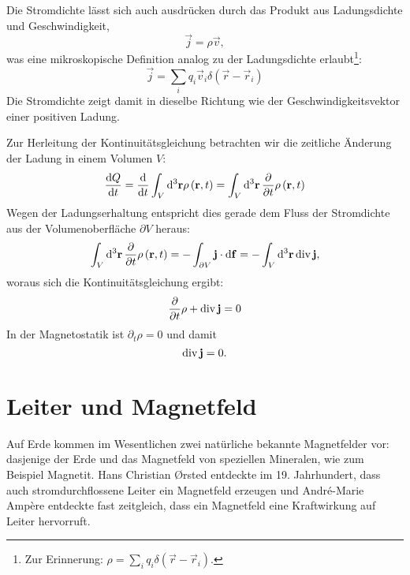 Die Stromdichte lässt sich auch ausdrücken durch das Produkt aus Ladungsdichte und Geschwindigkeit,
\begin{equation*}
	\vec {j}=\rho \vec {v},
\end{equation*}
was eine mikroskopische Definition analog zu der Ladungsdichte erlaubt\footnote{Zur Erinnerung: $\rho =\sum _{i}q_{i}\delta \left(\vec {r}-\vec {r}_{i}\right)$.}:
\begin{equation*}
	\vec {j}=\sum _{i}q_{i}\vec {v}_{i}\delta \left(\vec {r}-\vec {r}_{i}\right)
\end{equation*}
Die Stromdichte zeigt damit in dieselbe Richtung wie der Geschwindigkeitsvektor einer positiven Ladung.

Zur Herleitung der Kontinuitätsgleichung betrachten wir die zeitliche Änderung der Ladung in einem Volumen $V$:
\begin{equation*}
	\frac{\diff Q}{\diff t}=\frac{\diff }{\diff t}\int _{V}\diff^{3}\vec {r}\rho \left(\vec {r},t\right)=\int _{V}\diffa[3]{\vec{r}}\frac{\partial }{\partial t}\rho \left(\vec {r},t\right)
\end{equation*}
Wegen der Ladungserhaltung entspricht dies gerade dem Fluss der Stromdichte aus der Volumenoberfläche $\partial V$ heraus:
\begin{equation*}
	\int _{V}\diffa[3]{\vec{r}}\frac{\partial }{\partial t}\rho \left(\vec {r},t\right)=-\int _{\partial V}\vec {j}\cdot \diff \vec {f}=-\int _{V}\diffa[3]{\vec{r}}\divg \vec {j},
\end{equation*}
woraus sich die Kontinuitätsgleichung ergibt:
\begin{equation*}
	\frac{\partial }{\partial t}\rho +\divg \vec {j}=0
\end{equation*}
In der Magnetostatik ist $\partial _{t}\rho =0$ und damit
\begin{equation*}
	\divg \vec {j}=0.
\end{equation*}
\section{Leiter und Magnetfeld}

Auf Erde kommen im Wesentlichen zwei natürliche bekannte Magnetfelder vor: dasjenige der Erde und das Magnetfeld von speziellen Mineralen, wie zum Beispiel Magnetit. Hans Christian \O{}rsted entdeckte im 19. Jahrhundert, dass auch stromdurchflossene Leiter ein Magnetfeld erzeugen und André-Marie Ampère entdeckte fast zeitgleich, dass ein Magnetfeld eine Kraftwirkung auf Leiter hervorruft.

